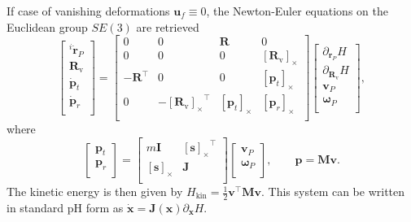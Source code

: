 \documentclass{svjour3}                     %
\newcommand{\crmat}[1]{\ensuremath{[#1]_{\times}}}
\begin{document}
\begin{remark}
	If case of vanishing deformations $\bm{u}_f \equiv 0$, the Newton-Euler equations on the Euclidean group $SE(3)$ are retrieved
	\begin{equation*}
	\begin{bmatrix}
	^i\dot{\bm{r}}_P \\ \bm{R}_{\text{v}} \\\dot{\bm{p}}_t \\ \dot{\bm{p}}_r \\
	\end{bmatrix} = 
	\begin{bmatrix}
	0 & 0 & \bm{R} & 0 \\
	0 & 0 & 0 & \crmat{\bm{R}_{\text{v}}} \\
	- \bm{R}^\top & 0 & 0 & \crmat{\bm{p}_t}\\
	0 & -\crmat{\bm{R}_{\text{v}}}^\top & \crmat{\bm{p}_t} & \crmat{\bm{p}_r} \\
	\end{bmatrix}
	\begin{bmatrix}
	\partial_{\bm{r}_P} H \\ \partial_{\bm{R}_{\text{v}}} H \\ \bm{v}_P \\ \bm{\omega}_P  \\
	\end{bmatrix},
	\end{equation*}
	where
	\begin{equation*}
	\begin{bmatrix}
	\bm{p}_t \\ \bm{p}_r \\ 
	\end{bmatrix} = 
	\begin{bmatrix}
	m \bm{I} & \crmat{\bm{s}}^\top \\
	\crmat{\bm{s}} & \bm{J} \\
	\end{bmatrix}
	\begin{bmatrix}
	\bm{v}_P \\ \bm{\omega}_P  \\ 
	\end{bmatrix}, \qquad \bm{p} = \bm{M} \bm{v}.
	\end{equation*}
	The kinetic energy is then given by $H_{\text{kin}} = \frac{1}{2} \bm{v}^\top \bm{M} \bm{v}$.
	This system can be written in standard pH form as $\dot{\bm{x}} = \bm{J}(\bm{x})\partial_{\bm{x}} H$.
\end{remark}
\end{document}

